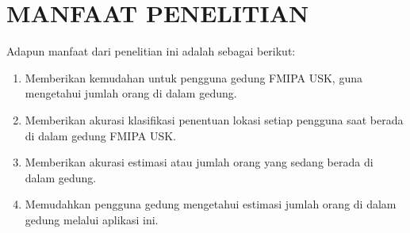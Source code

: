 \section{\uppercase{manfaat penelitian}}
Adapun manfaat dari penelitian ini adalah sebagai berikut:
\begin{enumerate}
	\item Memberikan kemudahan untuk pengguna gedung FMIPA USK, guna mengetahui jumlah orang di dalam gedung.
	\item Memberikan akurasi klasifikasi penentuan lokasi setiap pengguna saat berada di dalam gedung FMIPA USK.
	\item Memberikan akurasi estimasi atau jumlah orang yang sedang berada di dalam gedung.
	\item Memudahkan pengguna gedung mengetahui estimasi jumlah orang di dalam gedung melalui aplikasi ini.


\end{enumerate}
\begin{comment}

\end{comment}